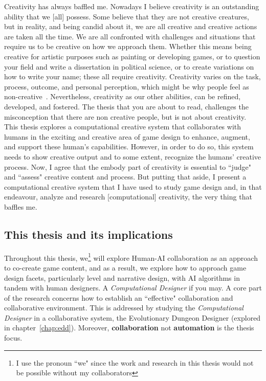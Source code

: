 Creativity has always baffled me. Nowadays I believe creativity is an outstanding ability that we [all] possess. Some believe that they are not creative creatures, but in reality, and being candid about it, we are all creative and creative actions are taken all the time. We are all confronted with challenges and situations that require us to be creative on how we approach them. Whether this means being creative for artistic purposes such as painting or developing games, or to question your field and write a dissertation in political science, or to create variations on how to write your name; these all require creativity. Creativity varies on the task, process, outcome, and personal perception, which might be why people feel as non-creative~\cite{kaufman_beyond_2009}. Nevertheless, creativity as our other abilities, can be refined, developed, and fostered. The thesis that you are about to read, challenges the misconception that there are non creative people, but is not about creativity. This thesis explores a computational creative system that collaborates with humans in the exciting and creative area of game design to enhance, augment, and support these human's capabilities. However, in order to do so, this system needs to show creative output and to some extent, recognize the humans' creative process. Now, I agree that the embody part of creativity is essential to ``judge" and ``assess" creative content and process. But putting that aside, I present a computational creative system that I have used to study game design and, in that endeavour, analyze and research [computational] creativity, the very thing that baffles me.

\subsection*{This thesis and its implications}

Throughout this thesis, we\footnote{I use the pronoun ``we" since the work and research in this thesis would not be possible without my collaborators} will explore Human-AI collaboration as an approach to co-create game content, and as a result, we explore how to approach game design facets, particularly level and narrative design, with AI algorithms in tandem with human designers. A \emph{Computational Designer} if you may. A core part of the research concerns how to establish an ``effective" collaboration and collaborative environment. This is addressed by studying the \emph{Computational Designer} in a collaborative system, the Evolutionary Dungeon Designer (explored in chapter~\ref{chap:edd}). Moreover, \textbf{collaboration} not \textbf{automation} is the thesis focus. 


